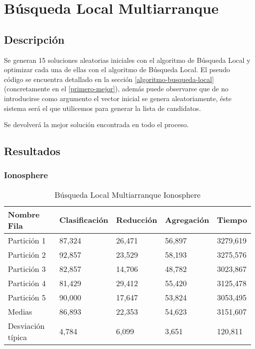 
\section{Búsqueda Local Multiarranque}  

\subsection{Descripción }

Se generan 15 soluciones aleatorias
iniciales con el algoritmo de Búsqueda Local y optimizar cada una de ellas con el algoritmo
de Búsqueda Local. 
El pseudo código se encuentra detallado en la sección 
\ref{algoritmo-busqueda-local} (concretamente en el \ref{primero-mejor}), además puede observarse que de no introducirse como argumento el vector inicial se genera aleatoriamente, éste sistema será el que utilicemos para generar la lista de candidatos. 

Se devolverá la mejor solución encontrada en todo
el proceso. 

\subsection{Resultados}
\subsubsection{Ionosphere}
\begin{table}[!ht]
    \centering
    \caption{Búsqueda Local Multiarranque Ionosphere}
    \begin{tabular}{|l|l|l|l|l|}
    \hline
        Nombre Fila & Clasificación & Reducción & Agregación & Tiempo \\ \hline
        Partición 1 & 87,324 & 26,471 & 56,897 & 3279,619 \\ \hline
        Partición 2 & 92,857 & 23,529 & 58,193 & 3275,576 \\ \hline
        Partición 3 & 82,857 & 14,706 & 48,782 & 3023,867 \\ \hline
        Partición 4 & 81,429 & 29,412 & 55,420 & 3125,478 \\ \hline
        Partición 5 & 90,000 & 17,647 & 53,824 & 3053,495 \\ \hline
        Medias  & 86,893 & 22,353 & 54,623 & 3151,607 \\ \hline
        Desviación típica & 4,784 & 6,099 & 3,651 & 120,811 \\ \hline
    \end{tabular}
    \label{BLB-Ionosphere}
\end{table}

